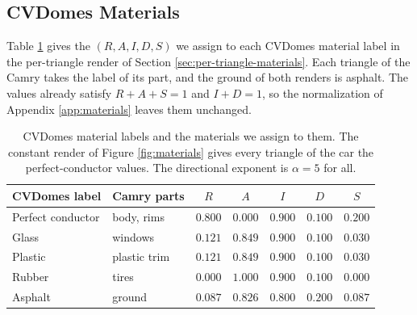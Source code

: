 \documentclass[sensors,article,submit,moreauthors]{Definitions/mdpi}
\begin{document}
\subsection{CVDomes Materials}
\label{app:cvdomes-materials}
Table \ref{tab:cvdomes-materials} gives the $(R,A,I,D,S)$ we assign to each
CVDomes material label
in the per-triangle render of Section \ref{sec:per-triangle-materials}. Each
triangle of the Camry
takes the label of its part, and the ground of both renders is asphalt. The
values already satisfy
$R+A+S=1$ and $I+D=1$, so the normalization of Appendix \ref{app:materials}
leaves them unchanged.
\begin{table}[H]
\centering
\caption{CVDomes material labels and the materials we assign to them. The
constant render of Figure
\ref{fig:materials} gives every triangle of the car the perfect-conductor
values. The directional exponent is
$\alpha = 5$ for all.}
\label{tab:cvdomes-materials}
\begin{tabular}{llccccc}
\toprule
\textbf{CVDomes label} & \textbf{Camry parts} & \textbf{$R$} & \textbf{$A$} &
\textbf{$I$} & \textbf{$D$} & \textbf{$S$} \\
\midrule
Perfect conductor & body, rims     & $0.800$ & $0.000$ & $0.900$ & $0.100$ &
$0.200$ \\
Glass             & windows        & $0.121$ & $0.849$ & $0.900$ & $0.100$ &
$0.030$ \\
Plastic           & plastic trim   & $0.121$ & $0.849$ & $0.900$ & $0.100$ &
$0.030$ \\
Rubber            & tires          & $0.000$ & $1.000$ & $0.900$ & $0.100$ &
$0.000$ \\
Asphalt           & ground         & $0.087$ & $0.826$ & $0.800$ & $0.200$ &
$0.087$ \\
\bottomrule
\end{tabular}
\end{table}
\end{document}
